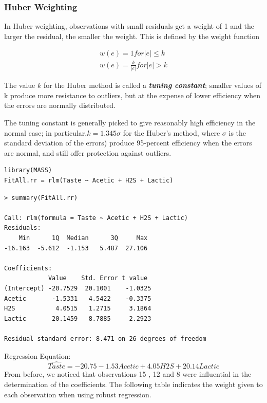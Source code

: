 \documentclass[12pt, a4paper]{article}
\theoremstyle{plain}
\theoremstyle{definition}
\theoremstyle{remark}
\begin{document}
\subsubsection{Huber Weighting}
In Huber weighting, observations with small residuals get a weight of 1 and the larger the residual, the smaller the weight. This is defined by the weight function


\begin{eqnarray}
w(e) = 1 for |e| \leq k  \\
w(e) = \frac{k}{|e|} for |e| > k
\end{eqnarray}


The value $k$ for the Huber method is called a \textbf{\textit{tuning constant}}; smaller values of k produce more resistance to outliers, but at the expense of lower efficiency when the errors are normally distributed.

The tuning constant is generally picked to give reasonably high efficiency in the normal case; in particular,$ k = 1.345\sigma$ for the Huber’s method, where $\sigma$ is the standard deviation of the errors) produce 95-percent efficiency when the errors are normal, and still offer protection against outliers.


\begin{framed}
\begin{verbatim}
library(MASS)
FitAll.rr = rlm(Taste ~ Acetic + H2S + Lactic)
\end{verbatim}
\end{framed}

\begin{verbatim}
> summary(FitAll.rr)

Call: rlm(formula = Taste ~ Acetic + H2S + Lactic)
Residuals:
    Min      1Q  Median      3Q     Max 
-16.163  -5.612  -1.153   5.487  27.106 

Coefficients:
            Value    Std. Error t value 
(Intercept) -20.7529  20.1001    -1.0325
Acetic       -1.5331   4.5422    -0.3375
H2S           4.0515   1.2715     3.1864
Lactic       20.1459   8.7885     2.2923

Residual standard error: 8.471 on 26 degrees of freedom
\end{verbatim}

Regression Equation: 
\[ \hat{Taste} = -20.75 -1.53 Acetic + 4.05 H2S + 20.14 Lactic\]
From before, we noticed that observations 15 , 12 and 8 were influential in the determination of the coefficients. The following table indicates the weight given to each observation when using robust regression.  
\end{document}
